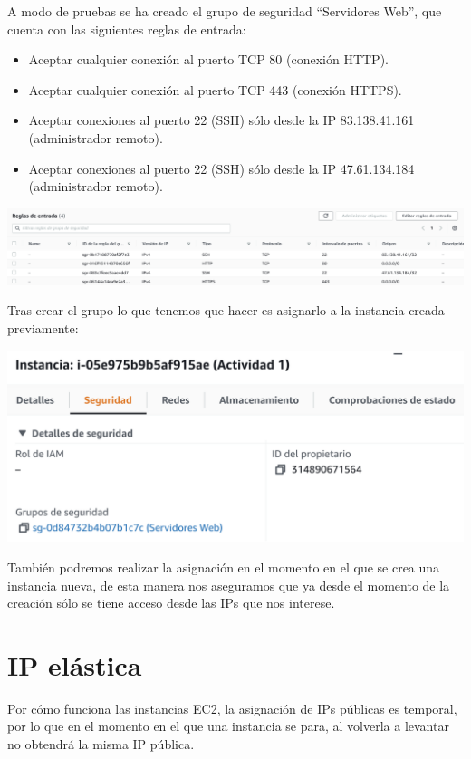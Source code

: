 \documentclass{\ClassPath/viu-tfm-template}
\begin{document}
A modo de pruebas se ha creado el grupo de seguridad “Servidores Web”, que cuenta con las siguientes reglas de entrada:
\begin{itemize}
    \item Aceptar cualquier conexión al puerto TCP 80 (conexión HTTP).
    \item Aceptar cualquier conexión al puerto TCP 443 (conexión HTTPS).
    \item Aceptar conexiones al puerto 22 (SSH) sólo desde la IP 83.138.41.161 (administrador remoto).
    \item Aceptar conexiones al puerto 22 (SSH) sólo desde la IP 47.61.134.184 (administrador remoto).
\end{itemize}

\begin{center}
    \includegraphics[frame,width=\linewidth]{img/grupos.png}
\end{center}

Tras crear el grupo lo que tenemos que hacer es asignarlo a la instancia creada previamente:

\begin{center}
    \includegraphics[frame,width=0.7\linewidth]{img/grupos2.png}
\end{center}

También podremos realizar la asignación en el momento en el que se crea una instancia nueva, de esta manera nos aseguramos que ya desde el momento de la creación sólo se tiene acceso desde las IPs que nos interese.


\chapter{IP elástica}

Por cómo funciona las instancias EC2, la asignación de IPs públicas es temporal, por lo que en el momento en el que una instancia se para, al volverla a levantar no obtendrá la misma IP pública.
\end{document}
